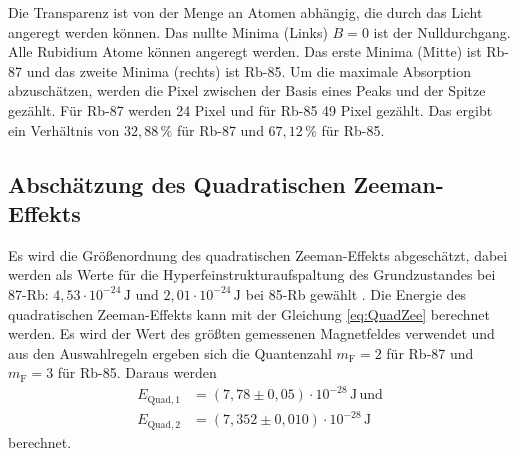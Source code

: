 Die Transparenz ist von der Menge an Atomen abhängig, die durch das Licht angeregt werden können.
Das nullte Minima (Links) $B = 0$ ist der Nulldurchgang.
Alle Rubidium Atome können angeregt werden.
Das erste Minima (Mitte) ist Rb-87 und das zweite Minima (rechts) ist Rb-85.
Um die maximale Absorption abzuschätzen, werden die Pixel zwischen der Basis eines Peaks und der Spitze gezählt.
Für Rb-87 werden 24 Pixel und für Rb-85 49 Pixel gezählt.
Das ergibt ein Verhältnis von $32,88\, \%$ für Rb-87 und $67,12 \, \% $ für Rb-85.

\subsection{Abschätzung des Quadratischen Zeeman-Effekts}

Es wird die Größenordnung des quadratischen Zeeman-Effekts abgeschätzt, 
dabei werden als Werte für die Hyperfeinstrukturaufspaltung des Grundzustandes bei 87-Rb: $4,53 \cdot 10^{-24} \, \unit{\joule} $ und $2,01 \cdot 10^{-24} \, \unit{\joule}$ bei  85-Rb  gewählt \cite{v21}.
Die Energie des quadratischen Zeeman-Effekts kann mit der Gleichung \eqref{eq:QuadZee} berechnet werden.
Es wird der Wert des größten gemessenen Magnetfeldes verwendet und aus den Auswahlregeln ergeben sich die Quantenzahl $m_\text{F} = 2$ für Rb-87 und $m_\text{F} = 3$ für Rb-85.
Daraus werden 
\begin{align*}
    E_{\text{Quad},1} &= \left(7,78  \pm 0,05 \right)   \cdot 10^{-28} \, \unit{\joule} \, \text{und} \\
    E_{\text{Quad},2} &= \left(7,352 \pm 0,010 \right) \cdot 10^{-28} \, \unit{\joule}
\end{align*}
berechnet.